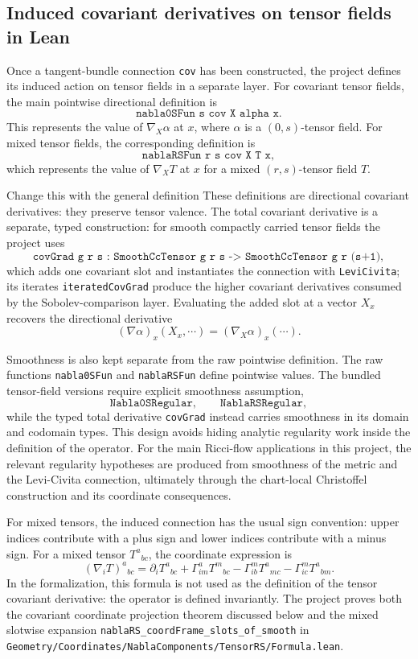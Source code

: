 \documentclass[11pt]{article}
\theoremstyle{plain}
\theoremstyle{definition}
\theoremstyle{remark}
\newcommand{\leanref}[1]{\nolinkurl{#1}}
\newcommand{\leanfile}[1]{\nolinkurl{#1}}
\newcommand{\rffile}[1]{\leanfile{#1}}
\begin{document}
\subsection{Induced covariant derivatives on tensor fields in Lean}

Once a tangent-bundle connection \texttt{cov} has been constructed, the project
defines its induced action on tensor fields in a separate layer.  For covariant
tensor fields, the main pointwise directional definition is
\[
  \texttt{nabla0SFun s cov X alpha x}.
\]
This represents the value of $\nabla_X\alpha$ at $x$, where $\alpha$ is a
$(0,s)$-tensor field.  For mixed tensor fields, the corresponding definition is
\[
  \texttt{nablaRSFun r s cov X T x},
\]
which represents the value of $\nabla_XT$ at $x$ for a mixed $(r,s)$-tensor
field $T$.

{\color{red}Change this with the general definition}
These definitions are directional covariant derivatives: they preserve tensor
valence.  The total covariant derivative is a separate, typed construction:
for smooth compactly carried tensor fields the project uses
\[
  \texttt{covGrad g r s : SmoothCcTensor g r s -> SmoothCcTensor g r (s+1)},
\]
which adds one covariant slot and instantiates the connection with
\leanref{LeviCivita}; its iterates \leanref{iteratedCovGrad} produce the
higher covariant derivatives consumed by the Sobolev-comparison layer.
Evaluating the added slot at a vector $X_x$ recovers the directional
derivative
\[
  (\nabla\alpha)_x(X_x,\cdots) = (\nabla_X\alpha)_x(\cdots).
\]

Smoothness is also kept separate from the raw pointwise definition.  The raw
functions \texttt{nabla0SFun} and \texttt{nablaRSFun} define pointwise
values.  The bundled tensor-field versions require explicit smoothness assumption,
\[
  \texttt{Nabla0SRegular}, \qquad
  \texttt{NablaRSRegular},
\]
while the typed total derivative \texttt{covGrad} instead carries smoothness
in its domain and codomain types.
This design avoids hiding analytic regularity work inside the definition of the
operator.  For the main Ricci-flow applications in this project, the relevant
regularity hypotheses are produced from smoothness of the metric and the
Levi-Civita connection, ultimately through the chart-local Christoffel
construction and its coordinate consequences.

For mixed tensors, the induced connection has the usual sign convention: upper
indices contribute with a plus sign and lower indices contribute with a minus
sign.  For a mixed tensor $T^a{}_{bc}$, the coordinate expression is
\[
  (\nabla_i T)^a{}_{bc}
  =
  \partial_i T^a{}_{bc}
  +
  \Gamma^a_{im} T^m{}_{bc}
  -
  \Gamma^m_{ib} T^a{}_{mc}
  -
  \Gamma^m_{ic} T^a{}_{bm}.
\]
In the formalization, this formula is not used as the definition of the tensor
covariant derivative: the operator is defined invariantly.  The project proves
both the covariant coordinate projection theorem discussed below and the mixed
slotwise expansion \leanref{nablaRS_coordFrame_slots_of_smooth} in
\rffile{Geometry/Coordinates/NablaComponents/TensorRS/Formula.lean}.  
\end{document}
